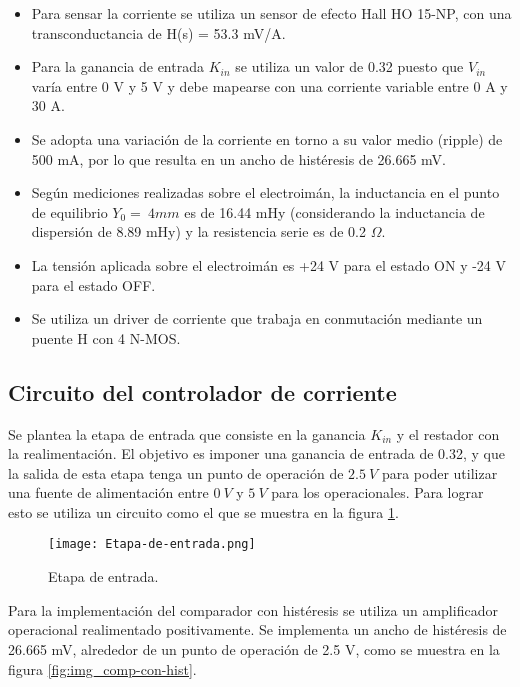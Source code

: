 \begin{itemize}
    \item Para sensar la corriente se utiliza un sensor de efecto Hall HO 15-NP, con una transconductancia de H(s) = 53.3 mV/A.
    \item Para la ganancia de entrada $K_{in}$ se utiliza un valor de 0.32 puesto que $V_{in}$ varía entre 0 V y 5 V y debe mapearse con una corriente variable entre 0 A y 30 A.
    \item Se adopta una variación de la corriente en torno a su valor medio (ripple) de 500 mA, por lo que resulta en un ancho de histéresis de 26.665 mV.
    \item Según mediciones realizadas sobre el electroimán, la inductancia en el punto de equilibrio $Y_0=\:4mm$ es de 16.44 mHy (considerando la inductancia de dispersión de 8.89 mHy) y la resistencia serie es de 0.2 $\Omega$.
    \item La tensión aplicada sobre el electroimán es +24 V para el estado ON y -24 V para el estado OFF.
    \item Se utiliza un driver de corriente que trabaja en conmutación mediante un puente H con 4 N-MOS. 
\end{itemize}

\subsection{Circuito del controlador de corriente}

\noindent Se plantea la etapa de entrada que consiste en la ganancia $K_{in}$ y el restador con la realimentación. El objetivo es imponer una ganancia de entrada de 0.32, y que la salida de esta etapa tenga un punto de operación de $2.5\:V$ para poder utilizar una fuente de alimentación entre $0\:V$ y $5\:V$ para los operacionales. Para lograr esto se utiliza un circuito como el que se muestra en la figura \ref{fig:img_etapa-de-entrada}.

\begin{figure}[H]
	\centering
	\texttt{[image: Etapa-de-entrada.png]}
	\caption{Etapa de entrada.}
	\label{fig:img_etapa-de-entrada}
\end{figure}

\noindent Para la implementación del comparador con histéresis se utiliza un amplificador operacional realimentado positivamente. Se implementa un ancho de histéresis de 26.665 mV,  alrededor de un punto de operación de 2.5 V, como se muestra en la figura \ref{fig:img_comp-con-hist}.

